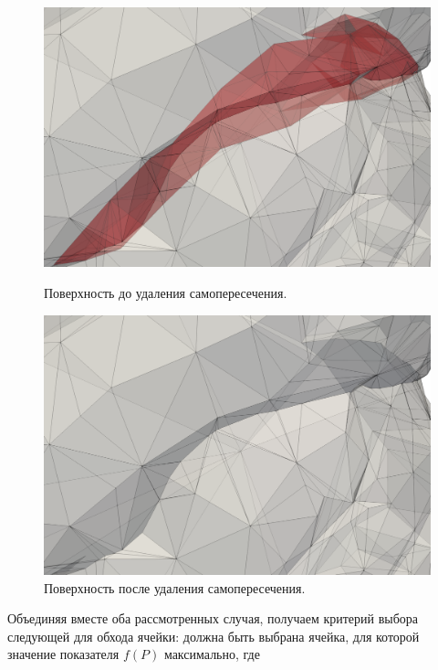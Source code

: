 \documentclass[
11pt,%
tightenlines,%
twoside,%
onecolumn,%
nofloats,%
nobibnotes,%
nofootinbib,%
superscriptaddress,%
noshowpacs,%
centertags]%
{revtex4}
\begin{document}
\begin{figure}[h]
  \centering
  \begin{minipage}[h]{0.49\textwidth}
    \includegraphics[width=\textwidth]{pics/pic_self_intersection_on_2.png}
    \caption{Поверхность до удаления самопересечения.}\label{fig:pic_self_intersection_on_2}
  \end{minipage}
  \hfill
  \begin{minipage}[h]{0.49\textwidth}
    \includegraphics[width=\textwidth]{pics/pic_self_intersection_off_2.png}
    \caption{Поверхность после удаления самопересечения.}\label{fig:pic_self_intersection_off_2}
  \end{minipage}
\end{figure}

Объединяя вместе оба рассмотренных случая, получаем критерий выбора следующей для обхода ячейки: должна быть выбрана ячейка, для которой значение показателя $f(P)$ максимально, где
\end{document}
